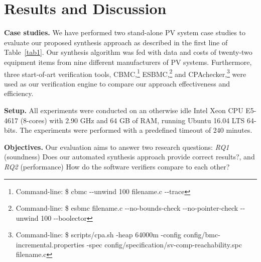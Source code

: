 \documentclass[runningheads]{llncs}
\begin{document}
\section{Results and Discussion}
\textbf{Case studies.} We have performed two stand-alone PV system case studies to evaluate our proposed synthesis approach as described in the first line of Table~\ref{tab1}. Our synthesis algorithm was fed with data and costs of twenty-two equipment items from nine different manufacturers of PV systems. Furthermore, three start-of-art verification tools, CBMC,\footnote{Command-line: \$ cbmc -\phantom{}-unwind 100 filename.c -\phantom{}-trace} ESBMC,\footnote{Command-line: \$ esbmc filename.c -\phantom{}-no-bounds-check -\phantom{}-no-pointer-check -\phantom{}-unwind 100 -\phantom{}-boolector} %
and CPAchecker,\footnote{Command-line: \$ scripts/cpa.sh -heap 64000m -config config/bmc-incremental.properties -spec config/specification/sv-comp-reachability.spc filename.c} were used as our verification engine to compare our approach effectiveness and efficiency. 

\textbf{Setup.} All experiments were conducted on an otherwise idle Intel Xeon CPU E5-4617 (8-cores) with 2.90 GHz and 64 GB of RAM, running Ubuntu 16.04 LTS 64-bits. 
The experiments were performed with a predefined timeout of $240$ minutes.

\textbf{Objectives.} Our evaluation aims to answer two research questions: \textit{RQ1} (soundness) Does our automated synthesis approach provide correct results?, and \textit{RQ2} (performance) How do the software verifiers compare to each other?
\end{document}
